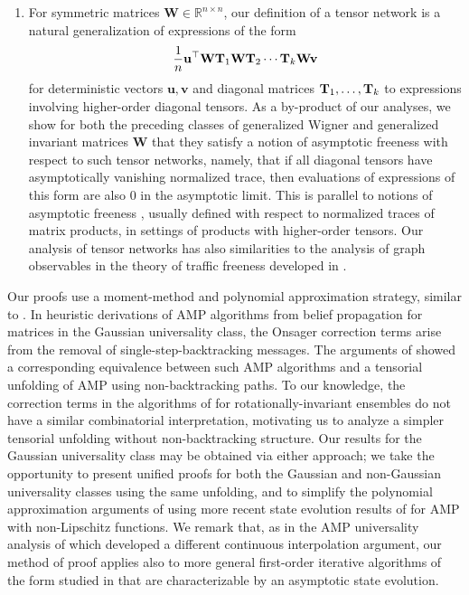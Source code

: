 \documentclass[10pt,reqno]{amsart}
\def\u{\mathbf{u}}
\def\v{\mathbf{v}}
\def\W{\mathbf{W}}
\def\R{\mathbb{R}}
\begin{document}
\begin{enumerate}
admits a simple combinatorial analysis for all of the preceding matrix ensembles. Our argument for the first step is general and holds irrespective of the specific matrix ensemble. 
We propose this two-step proof framework
in part to enable easier extensions of AMP universality to other random matrix 
models (e.g.\ having sufficiently weak or short-range correlation across
entries) as this need arises in applications.
\item For symmetric matrices $\W \in \R^{n \times n}$, our definition of a tensor
network is a natural generalization of expressions of the form
\[\frac{1}{n}\u^\top \W\bT_1\W\bT_2 \cdots \bT_k\W\v\]
for deterministic vectors $\u,\v$ and diagonal matrices
$\mathbf{T}_1,\ldots,\mathbf{T}_k$ to expressions involving higher-order diagonal tensors.
As a by-product of our analyses, we show for both the preceding classes of
generalized Wigner and generalized invariant matrices
$\W$ that they satisfy a notion of
asymptotic freeness with respect to such tensor networks, namely, that if all
diagonal tensors have asymptotically vanishing normalized trace, then 
evaluations of expressions of this form are also 0 in the asymptotic limit. This
is parallel to notions of asymptotic freeness \cite{voiculescu1992free}, usually
defined with respect to normalized traces of matrix products,
in settings of products with higher-order tensors. 
Our analysis of tensor
networks has also similarities to the analysis of graph observables in the
theory of traffic freeness developed in \cite{male2020traffic}.
\end{enumerate}

Our proofs use a moment-method and polynomial approximation strategy,
similar to \cite{bayati2015universality}. In heuristic derivations of AMP
algorithms from belief propagation for matrices in the Gaussian universality
class, the Onsager correction terms arise from the removal of
single-step-backtracking messages. The arguments of
\cite{bayati2015universality} showed a corresponding
equivalence between such AMP algorithms and a
tensorial unfolding of AMP using non-backtracking paths. To our knowledge, the
correction terms in the algorithms of \cite{fan2022approximate} for
rotationally-invariant ensembles do not have a similar combinatorial
interpretation, motivating us to analyze a
simpler tensorial unfolding without non-backtracking structure.
Our results for the Gaussian universality class may be obtained via either
approach; we take the opportunity to present unified proofs for both the
Gaussian and non-Gaussian universality classes using the same unfolding,
and to simplify
the polynomial approximation arguments of \cite{bayati2015universality}
using more recent state evolution results of
\cite{fan2022approximate} for AMP with non-Lipschitz functions.
We remark that, as in the AMP universality analysis
of \cite{chen2021universality} which developed a
different continuous interpolation argument, our method of proof applies also
to more general first-order iterative algorithms of the form studied in
\cite{celentano2020estimation} that are characterizable by an asymptotic state
evolution.
\end{document}
